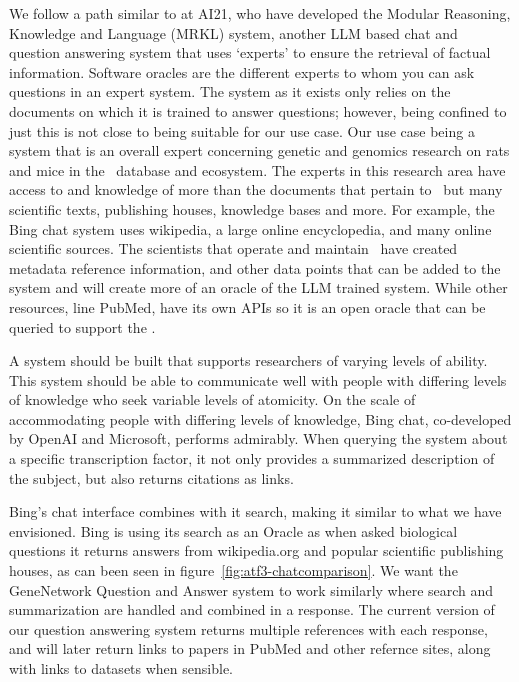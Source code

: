We follow a path similar to \cite{Karpas:2022:mrkl} at AI21, who have developed the Modular Reasoning, Knowledge and Language (MRKL) system, another LLM based chat and question answering system that uses `experts' to ensure the retrieval of factual information.
Software oracles are the different experts to whom you can ask questions in an expert system.
The system as it exists only relies on the documents on which it is trained to answer questions; however, being confined to just this is not close to being suitable for our use case.
Our use case being a system that is an overall expert concerning genetic and genomics research on rats and mice in the \GN\ database and ecosystem.
The experts in this research area have access to and knowledge of more than the documents that pertain to \GN\ but many scientific texts, publishing houses, knowledge bases and more.
For example, the Bing chat system uses wikipedia, a large online encyclopedia, and many online scientific sources.
The scientists that operate and maintain \GN\ have created metadata reference information, and other data points that can be added to the system and will create more of an oracle of the LLM trained system.
While other resources, line PubMed, have its own APIs so it is an open oracle that can be queried to support the \project.

A system should be built that supports researchers of varying levels of ability.
This system should be able to communicate well with people with differing levels of knowledge who seek variable levels of atomicity.
On the scale of accommodating people with differing levels of knowledge, Bing chat, co-developed by OpenAI and Microsoft, performs admirably.
When querying the system about a specific transcription factor, it not only provides a summarized description of the subject, but also returns citations as links.



Bing's chat interface combines with it search, making it similar to what we have envisioned. 
Bing is using its search as an Oracle as when asked biological questions it returns answers from wikipedia.org and popular scientific publishing houses, as can been seen in figure~\ref{fig:atf3-chatcomparison}.
We want the GeneNetwork Question and Answer system to work similarly where search and summarization are handled and combined in a response.
The current version of our question answering system returns multiple references with each response, and will later return links to papers in PubMed and other refernce sites, along with links to datasets when sensible.

